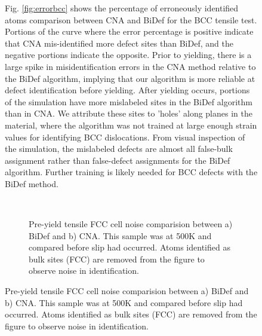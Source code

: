 \documentclass[12pt]{iopart}
\begin{document}
\begin{figure}[htbp]
Fig. \ref{fig:errorbcc} shows the percentage of erroneously identified atoms comparison between CNA and BiDef for the BCC tensile test. Portions of the curve where the error percentage is positive indicate that CNA mis-identified more defect sites than BiDef, and the negative portions indicate the opposite. Prior to yielding, there is a large spike in misidentification errors in the CNA method relative to the BiDef algorithm, implying that our algorithm is more reliable at defect identification before yielding. After yielding occurs, portions of the simulation have more mislabeled sites in the BiDef algorithm than in CNA. We attribute these sites to 'holes' along planes in the material, where the algorithm was not trained at large enough strain values for identifying BCC dislocations. From visual inspection of the simulation, the mislabeled defects are almost all false-bulk assignment rather than false-defect assignments for the BiDef algorithm. Further training is likely needed for BCC defects with the BiDef method.

\begin{figure}
\begin{center}
 \\
\caption{Pre-yield tensile FCC cell noise comparision between a) BiDef and b) CNA. This sample was at 500K and compared before slip had occurred. Atoms identified as bulk sites (FCC) are removed from the figure to observe noise in identification.}
\label{fig:bcc_noise}
\end{center}
\end{figure}


\end{figure}
\end{document}

